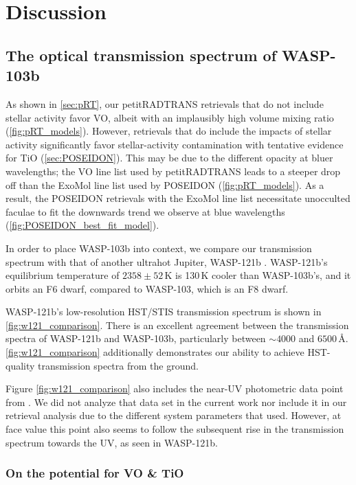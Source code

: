 \documentclass[twocolumn]{aastex63}
\begin{document}
\section{Discussion}
\label{sec:discussion}

\subsection{The optical transmission spectrum of WASP-103b}
\label{sec:d_optical_trans_spec}

As shown in \autoref{sec:pRT}, our petitRADTRANS retrievals that do not include stellar activity favor VO, albeit with an implausibly high volume mixing ratio (\autoref{fig:pRT_models}). However, retrievals that do include the impacts of stellar activity significantly favor stellar-activity contamination with tentative evidence for TiO (\autoref{sec:POSEIDON}). This may be due to the different opacity at bluer wavelengths; the \cite{Plez1999} VO line list used by petitRADTRANS leads to a steeper drop off than the ExoMol line list used by POSEIDON (\autoref{fig:pRT_models}). As a result, the POSEIDON retrievals with the ExoMol line list necessitate unocculted faculae to fit the downwards trend we observe at blue wavelengths (\autoref{fig:POSEIDON_best_fit_model}).

In order to place WASP-103b into context, we compare our transmission spectrum with that of another ultrahot Jupiter, WASP-121b \citep{Delrez2016}. WASP-121b's equilibrium temperature of $2358 \pm 52$\,K is 130\,K cooler than WASP-103b's, and it orbits an F6 dwarf, compared to WASP-103, which is an F8 dwarf. 

WASP-121b's low-resolution HST/STIS transmission spectrum \citep{Evans2018} is shown in \autoref{fig:w121_comparison}. There is an excellent agreement between the transmission spectra of WASP-121b and WASP-103b, particularly between ${\sim}4000$ and $6500$\,\AA. \autoref{fig:w121_comparison} additionally demonstrates our ability to achieve HST-quality transmission spectra from the ground.

Figure \ref{fig:w121_comparison} also includes the near-UV photometric data point from \cite{Turner2017}. We did not analyze that data set in the current work nor include it in our retrieval analysis due to the different system parameters that \cite{Turner2017} used. However, at face value this point also seems to follow the subsequent rise in the transmission spectrum towards the UV, as seen in WASP-121b. 

\subsubsection{On the potential for VO \& TiO}
\label{sec:d_VO}
\end{document}
